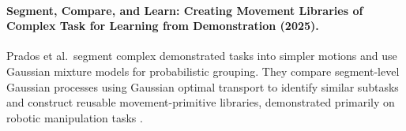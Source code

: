 \documentclass[a4paper]{article}
\begin{document}
   \paragraph{Segment, Compare, and Learn: Creating Movement Libraries of Complex Task for Learning from Demonstration (2025).}
   Prados et al.\ segment complex demonstrated tasks into simpler motions and use Gaussian mixture models for probabilistic grouping. They compare segment-level Gaussian processes using Gaussian optimal transport to identify similar subtasks and construct reusable movement-primitive libraries, demonstrated primarily on robotic manipulation tasks \cite{prados-2025-segment-compare-and-learn-creating-movement-libraries}.

   
   
\end{document}
